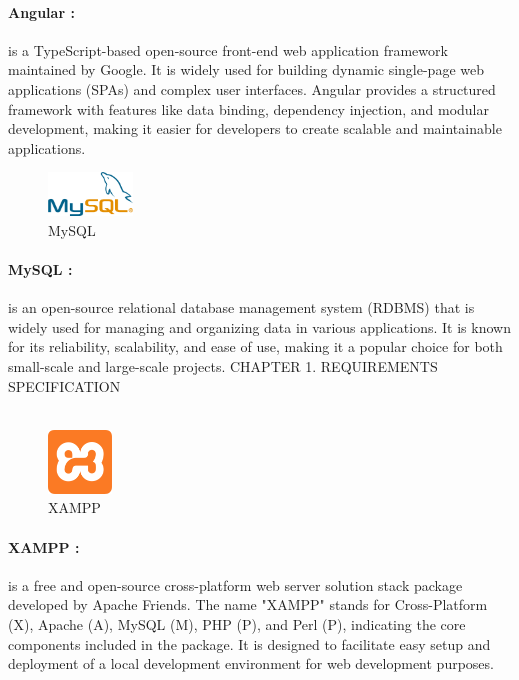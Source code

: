 \documentclass{article}
\begin{document}
\paragraph{Angular :} 
is a TypeScript-based open-source front-end web application framework maintained by Google. It is widely used for building dynamic single-page web applications (SPAs) and complex user interfaces. Angular provides a structured framework with features like data binding, dependency injection, and modular development, making it easier for developers to create scalable and maintainable applications.
\vspace{1cm}

\begin{figure}[htbp]
    \centering
    \includegraphics[width=0.2\textwidth]{aaaa}
    \caption{MySQL}
    \label{fig:design4}
\end{figure}
\paragraph{MySQL :} 
 is an open-source relational database management system (RDBMS) that is widely used for managing and organizing data in various applications. It is known for its reliability, scalability, and ease of use, making it a popular choice for both small-scale and large-scale projects.
\vspace{1cm} 
\newpage
\noindent
CHAPTER 1.  REQUIREMENTS SPECIFICATION \\
\underline{\hspace{\textwidth}} \vspace{0.2cm}\\
\begin{figure}[htbp]
    \centering
    \includegraphics[width=0.15\textwidth]{fff}
    \caption{XAMPP }
    \label{fig:design5}
\end{figure}
\paragraph{XAMPP :} 
is a free and open-source cross-platform web server solution stack package developed by Apache Friends. The name "XAMPP" stands for Cross-Platform (X), Apache (A), MySQL (M), PHP (P), and Perl (P), indicating the core components included in the package. It is designed to facilitate easy setup and deployment of a local development environment for web development purposes.
\vspace{1cm}
\end{document}
